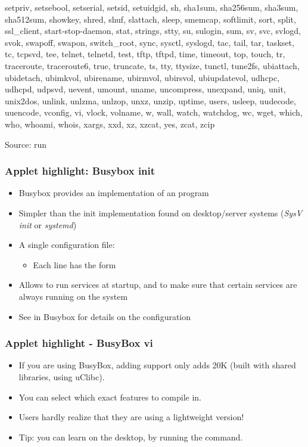 \begin{frame}
\begin{spacing}{0}
{setpriv, setsebool, setserial, setsid, setuidgid, sh, sha1sum,
sha256sum, sha3sum, sha512sum, showkey, shred, shuf, slattach, sleep,
smemcap, softlimit, sort, split, ssl_client, start-stop-daemon, stat,
strings, stty, su, sulogin, sum, sv, svc, svlogd, svok, swapoff, swapon,
switch_root, sync, sysctl, syslogd, tac, tail, tar, taskset, tc, tcpsvd,
tee, telnet, telnetd, test, tftp, tftpd, time, timeout, top, touch, tr,
traceroute, traceroute6, true, truncate, ts, tty, ttysize, tunctl,
tune2fs, ubiattach, ubidetach, ubimkvol, ubirename, ubirmvol, ubirsvol,
ubiupdatevol, udhcpc, udhcpd, udpsvd, uevent, umount, uname, uncompress, unexpand, uniq,
unit, unix2dos, unlink, unlzma, unlzop, unxz, unzip, uptime, users,
usleep, uudecode, uuencode, vconfig, vi, vlock, volname, w, wall, watch,
watchdog, wc, wget, which, who, whoami, whois, xargs, xxd, xz, xzcat,
yes, zcat, zcip}
  \end{spacing}
  \vfill
  Source: run 
\end{frame}

\begin{frame}
  \frametitle{Applet highlight: Busybox init}
  \begin{itemize}
  \item Busybox provides an implementation of an  program
  \item Simpler than the init implementation found on desktop/server
    systems ({\em SysV init} or {\em systemd})
  \item A single configuration file: 
    \begin{itemize}
    \item Each line has the form 
    \end{itemize}
  \item Allows to run services at startup, and to make sure that
    certain services are always running on the system
  \item See  in Busybox for details on the
    configuration
  \end{itemize}
\end{frame}

\begin{frame}
  \frametitle{Applet highlight - BusyBox vi}
  \begin{itemize}
  \item If you are using BusyBox, adding  support only adds
    20K (built with shared libraries, using uClibc).
  \item You can select which exact features to compile in.
  \item Users hardly realize that they are using a lightweight 
    version!
  \item Tip: you can learn  on the desktop, by running the 
    command.
  \end{itemize}
\end{frame}

